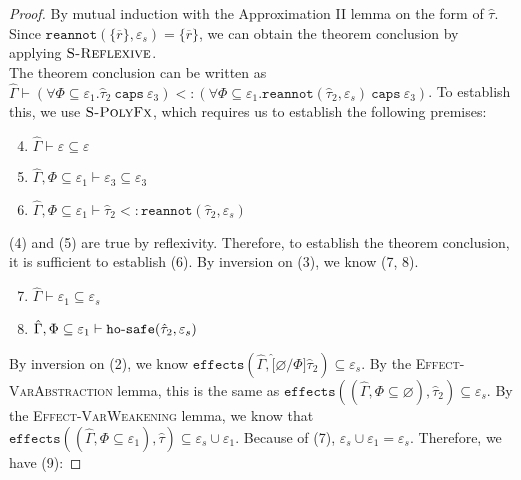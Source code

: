 \documentclass{llncs}
\newcommand{\keywadj}[1]{\mathtt{#1}}
\newcommand{\keyw}[1]{\keywadj{#1}~}
\newcommand{\kw}[1]{\keyw{ #1 }}
\newcommand{\kwa}[1]{\keywadj{ #1 }}
\newcommand{\hyphen}{\hbox{-}}
\newcommand{\fx}[1]{ \kwa{effects}(#1) }
\newcommand{\hosafe}[2]{ \kwa{ho \hyphen safe}(#1, #2) }
\newcommand{\reannot}[2]{
	\keywadj{reannot}(#1, #2)
}
\begin{document}
\begin{proof}

\noindent
By mutual induction with the Approximation II lemma on the form of $\hat \tau$.\\

 Since $\reannot{\{ \overline{r} \}}{\varepsilon_s} = \{ \overline{r} \}$, we can obtain the theorem conclusion by applying $\textsc{S-Reflexive}$. \\

\fbox{Case: $\hat \tau = \forall X <: \hat \tau_1. \hat \tau_2~\kw{caps} \varepsilon_3$}  The theorem conclusion can be written as $\hat \Gamma \vdash (\forall \Phi \subseteq \varepsilon_1. \hat \tau_2~\kw{caps} \varepsilon_3) <: (\forall \Phi \subseteq \varepsilon_1. \reannot{\hat \tau_2}{\varepsilon_s}~\kw{caps} \varepsilon_3)$. To establish this, we use $\textsc{S-PolyFx}$, which requires us to establish the following premises:

\begin{enumerate}
	\setcounter{enumi}{3}
	\item $\hat \Gamma \vdash \varepsilon \subseteq \varepsilon$
	\item $\hat \Gamma, \Phi \subseteq \varepsilon_1 \vdash \varepsilon_3 \subseteq \varepsilon_3$
	\item $\hat \Gamma, \Phi \subseteq \varepsilon_1 \vdash \hat \tau_2 <: \reannot{\hat \tau_2}{\varepsilon_s}$
\end{enumerate}

\noindent
(4) and (5) are true by reflexivity. Therefore, to establish the theorem conclusion, it is sufficient to establish (6). By inversion on (3), we know (7, 8).

\begin{enumerate}
	\setcounter{enumi}{6}
	\item $\hat \Gamma \vdash \varepsilon_1 \subseteq \varepsilon_s$
	\item $\hat \Gamma, \Phi \subseteq \varepsilon_1 \vdash \hosafe{\hat \tau_2}{\varepsilon_s}$
\end{enumerate}

\noindent
By inversion on (2), we know $\fx{\hat \Gamma, \hat [\varnothing/\Phi]\hat \tau_2} \subseteq \varepsilon_s$. By the \textsc{Effect-VarAbstraction} lemma, this is the same as $\fx{(\hat \Gamma, \Phi \subseteq \varnothing), \hat \tau_2} \subseteq \varepsilon_s$. By the \textsc{Effect-VarWeakening} lemma, we know that $\fx{(\hat \Gamma, \Phi \subseteq \varepsilon_1), \hat \tau} \subseteq \varepsilon_s \cup \varepsilon_1$. Because of (7), $\varepsilon_s \cup \varepsilon_1 = \varepsilon_s$. Therefore, we have (9):


\end{proof}
\end{document}
